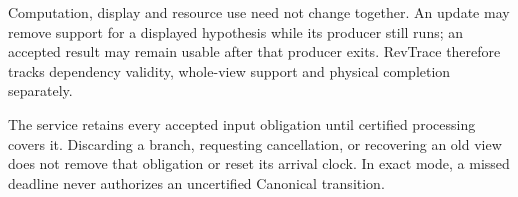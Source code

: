 Computation, display and resource use need not change together. An update
may remove support for a displayed hypothesis while its producer still
runs; an accepted result may remain usable after that producer exits.
RevTrace therefore tracks dependency validity, whole-view support and
physical completion separately.

The service retains every accepted input obligation until certified
processing covers it. Discarding a branch, requesting cancellation, or
recovering an old view does not remove that obligation or reset its arrival
clock. In exact mode, a missed deadline never authorizes an uncertified
Canonical transition.
